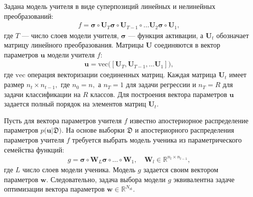 \documentclass{dissert}
\begin{document}
Задана модель учителя в виде суперпозиций линейных и нелинейных преобразований:
\[
\label{ch:3:eq:st:2}
\begin{aligned}
f = \bm{\sigma} \circ \mathbf{U}_T \bm{\sigma} \circ \mathbf{U}_{T-1}\circ \ldots  \mathbf{U}_2\bm{\sigma} \circ \mathbf{U}_1,
\end{aligned}
\]
где $T$ --- число слоев модели учителя, $\bm{\sigma}$ --- функция активации, а $\mathbf{U}_t$ обозначает матрицу линейного преобразования. Матрицы $\mathbf{U}$ соединяются в вектор параметров $\mathbf{u}$ модели учителя $f$:
\[
\label{ch:3:eq:st:2.1}
\begin{aligned}
\mathbf{u} = \text{vec}\bigr(\left[\mathbf{U}_T, \mathbf{U}_{T-1}, \ldots \mathbf{U}_1\right]\bigr),
\end{aligned}
\]
где $\text{vec}$ операция векторизации соединенных матриц.
Каждая матрица $\mathbf{U}_t$ имеет размер $n_t\times n_{t-1},$ где $n_0=n,$ а  $n_T={1}$ для задачи регрессии и $n_T=R$ для задачи классификации на $R$ классов. Для построения вектора параметров $\mathbf{u}$ задается полный порядок на элементов матриц $\mathbf{U}_t$.

Пусть для вектора параметров учителя $f$ известно апостериорное распределение параметров $p\bigr(\mathbf{u}|\mathfrak{D}\bigr)$. 
На основе выборки $\mathfrak{D}$ и апостериорного распределения параметров учителя $f$ требуется выбрать модель ученика из параметрического семейства функций:
\[
\label{ch:3:eq:st:5}
\begin{aligned}
g = \bm{\sigma} \circ \mathbf{W}_L\bm{\sigma}  \circ \ldots \circ \mathbf{W}_1, \quad \mathbf{W}_l \in \mathbb{R}^{n_l \times n_{l-1}},
\end{aligned}
\]
где $L$ число слоев модели ученика.
Модель $g$ задается своим вектором параметров $\mathbf{w}$.
Следовательно, задача выбора модели $g$ эквивалентна задаче оптимизации вектора параметров $\mathbf{w}\in\mathbb{R}^{N_{\text{st}}}$.
\end{document}
